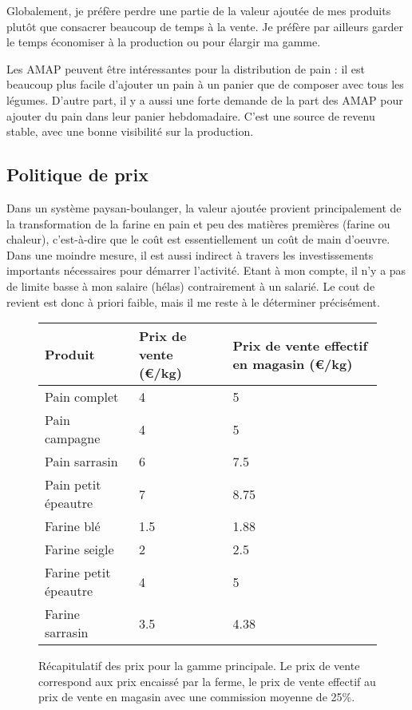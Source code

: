 \documentclass{book}
\begin{document}
Globalement, je préfère perdre une partie de la valeur ajoutée de mes produits plutôt que consacrer beaucoup de temps à la vente. Je préfère par ailleurs garder le temps économiser à la production ou pour élargir ma gamme. 

Les AMAP peuvent être intéressantes pour la distribution de pain : il est beaucoup plus facile d’ajouter un pain à un panier que de composer avec tous les légumes. D’autre part, il y a aussi une forte demande de la part des AMAP pour ajouter du pain dans leur panier hebdomadaire. C’est une source de revenu stable, avec une bonne visibilité sur la production. 

\subsection{Politique de prix}

Dans un système paysan-boulanger, la valeur ajoutée provient principalement de la transformation de la farine en pain et peu des matières premières (farine ou chaleur), c’est-à-dire que le coût est essentiellement un coût de main d’oeuvre. Dans une moindre mesure, il est aussi indirect à travers les investissements importants nécessaires pour démarrer l’activité. Etant à mon compte, il n’y a pas de limite basse à mon salaire (hélas) contrairement à un salarié. Le cout de revient est donc à priori faible, mais il me reste à le déterminer précisément. 

\begin{figure}[h!]
\center
\footnotesize
\begin{tabular}{ | p{3cm} | p{3cm}| p{3cm}|}
\hline
	 Produit & Prix de vente (\euro{}/kg) & Prix de vente effectif en magasin (\euro{}/kg) \\ \hline
	 \hline
	Pain complet & 4 & 5 \\ \hline
	Pain campagne & 4 & 5 \\ \hline
	Pain sarrasin & 6 & 7.5 \\ \hline
	Pain petit épeautre & 7 & 8.75 \\ \hline
	\hline
	Farine blé & 1.5 & 1.88 \\ \hline
	Farine seigle & 2 & 2.5 \\ \hline
	Farine petit épeautre & 4 & 5 \\ \hline
	Farine sarrasin & 3.5 & 4.38 \\ \hline
\end{tabular}
\caption{Récapitulatif des prix pour la gamme principale. Le prix de vente correspond aux prix encaissé par la ferme, le prix de vente effectif au prix de vente en magasin avec une commission moyenne de 25\%.}
\label{tab:prix}
\end{figure}
\end{document}
